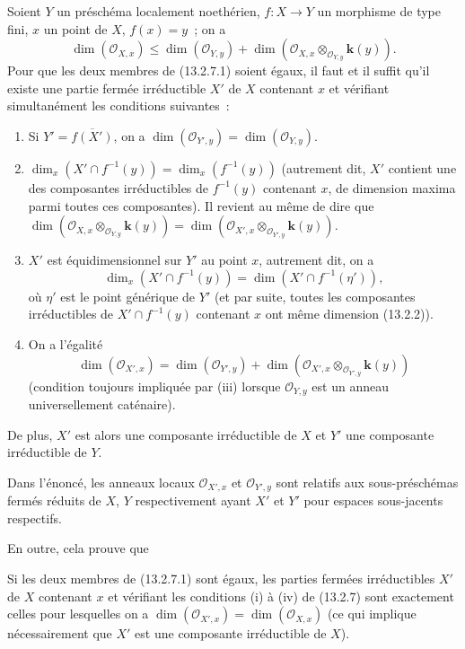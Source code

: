 \begin{proposition}[13.2.7]
\label{IV.13.2.7-fr}
Soient $Y$ un préschéma localement noethérien, $f:X\to Y$ un morphisme de type
fini, $x$ un point de $X$, $f(x)=y$~; on a
\[
\tag{13.2.7.1}
\label{IV.13.2.7.1-fr}
  \dim(\mathcal O_{X,x})\leq\dim(\mathcal O_{Y,y})
  +\dim(\mathcal O_{X,x}\otimes_{\mathcal O_{Y,y}}\boldsymbol{k}(y)).
\]
Pour que les deux membres de \textup{(13.2.7.1)} soient égaux, il faut et il suffit
qu'il existe une partie fermée irréductible $X'$ de $X$ contenant $x$ et
vérifiant simultanément les conditions suivantes~:
\begin{enumerate}[label=\textup{(\roman*)}]
  \item Si $Y'=\overline{f(X')}$, on a
  $\dim(\mathcal O_{Y',y})=\dim(\mathcal O_{Y,y})$.
  \item $\dim_x(X'\cap f^{-1}(y))=\dim_x(f^{-1}(y))$ (autrement dit, $X'$
  contient une des composantes irréductibles de $f^{-1}(y)$ contenant $x$, de
  dimension maxima parmi toutes ces composantes). Il revient au même de dire
  que
  $\dim(\mathcal O_{X,x}\otimes_{\mathcal O_{Y,y}}\boldsymbol{k}(y))
  =\dim(\mathcal O_{X',x}\otimes_{\mathcal O_{Y',y}}\boldsymbol{k}(y))$.
  \item $X'$ est équidimensionnel sur $Y'$ au point $x$, autrement dit, on a
  \[
    \dim_x(X'\cap f^{-1}(y))=\dim(X'\cap f^{-1}(\eta')),
  \]
  où $\eta'$ est le point générique de $Y'$ (et par suite, toutes les
  composantes irréductibles de $X'\cap f^{-1}(y)$ contenant $x$ ont même
  dimension \textup{(13.2.2)}).

  \item On a l'égalité
  \[
    \dim(\mathcal O_{X',x})=\dim(\mathcal O_{Y',y})
    +\dim(\mathcal O_{X',x}\otimes_{\mathcal O_{Y',y}}\boldsymbol{k}(y))
  \]
  (condition toujours impliquée par \textup{(iii)} lorsque $\mathcal O_{Y,y}$ est un
  anneau universellement caténaire).
\end{enumerate}

De plus, $X'$ est alors une composante irréductible de $X$ et $Y'$ une
composante irréductible de $Y$.
\end{proposition}

Dans l'énoncé, les anneaux locaux $\mathcal O_{X',x}$ et
$\mathcal O_{Y',y}$ sont relatifs aux sous-préschémas fermés réduits de $X$,
$Y$ respectivement ayant $X'$ et $Y'$ pour espaces sous-jacents respectifs.

En outre, cela prouve que

\begin{corollary}[13.2.8]
\label{IV.13.2.8-fr}
Si les deux membres de \textup{(13.2.7.1)} sont égaux, les parties fermées irréductibles
$X'$ de $X$ contenant $x$ et vérifiant les conditions \textup{(i)} à \textup{(iv)} de \textup{(13.2.7)}
sont exactement celles pour lesquelles on a
$\dim(\mathcal O_{X',x})=\dim(\mathcal O_{X,x})$ (ce qui implique
nécessairement que $X'$ est une composante irréductible de $X$).
\end{corollary}

